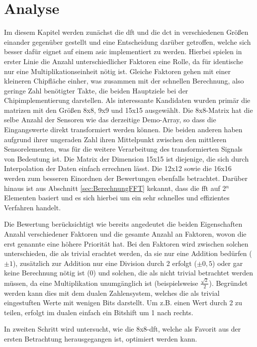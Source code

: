 \chapter{Analyse}
Im diesem Kapitel werden zunächst die \gls{dft} und die \gls{dct} in verschiedenen Größen einander gegenüber gestellt und eine Entscheidung darüber getroffen, welche
sich besser dafür eignet auf einem \gls{asic} implementiert zu werden. Hierbei spielen in erster Linie die Anzahl unterschiedlicher Faktoren eine Rolle, 
da für identische nur eine Multiplikationseinheit nötig ist. Gleiche Faktoren gehen mit einer kleineren Chipfläche einher, was zusammen mit der schnellen 
Berechnung, also geringe Zahl benötigter Takte, die beiden Hauptziele bei der Chipimplementierung darstellen.
Als interessante Kandidaten wurden primär die matrizen mit den Größen 8x8, 9x9 und 15x15 ausgewählt. 
Die 8x8-Matrix hat die selbe Anzahl der Sensoren wie das derzeitige Demo-Array, so dass die Eingangswerte
direkt transformiert werden können. 
Die beiden anderen haben aufgrund ihrer ungeraden Zahl ihren Mittelpunkt zwischen den mittleren Sensorelementen, was für die 
weitere Verarbeitung des transformierten Signals von Bedeutung ist. Die Matrix der Dimension 15x15 ist diejenige, die sich durch Interpolation der Daten einfach errechnen lässt.
Die 12x12 sowie die 16x16 werden zum besseren Einordnen der Bewertungen ebenfalls betrachtet.
Darüber hinaus ist aus Abschnitt \ref{sec:BerechnungFFT} kekannt, dass die \gls{fft} auf 2$^n$ Elementen basiert und es sich hierbei um ein sehr schnelles und 
effizientes Verfahren handelt. 


Die Bewertung berücksichtigt wie bereits angedeutet die beiden Eigenschaften Anzahl verschiedener Faktoren und die gesamte Anzahl an Faktoren, wovon die erst genannte 
eine höhere Priorität hat. Bei den Faktoren wird zwischen solchen unterschieden, die als trivial erachtet werden, da sie nur eine Addition bedürfen ($\pm1$), zusätzlich
zur Addition nur eine Division durch 2 erfolgt ($\pm0,5$) oder gar keine Berechnung nötig ist ($0$) und solchen, die als nicht trivial betrachtet werden müssen, da eine Multiplikation
unumgänglich ist (beispielsweise $\tfrac{\sqrt{2}}{2}$). Begründet werden kann dies mit dem dualen Zahlensystem, welches die als trivial eingestuften Werte mit wenigen Bits 
darstellt. Um z.B. einen Wert durch 2 zu teilen, erfolgt im dualen einfach ein Bitshift um 1 nach rechts.

In zweiten Schritt wird untersucht, wie die 8x8-\gls{dft}, welche als Favorit aus der ersten Betrachtung herausgegangen ist, optimiert werden kann.



